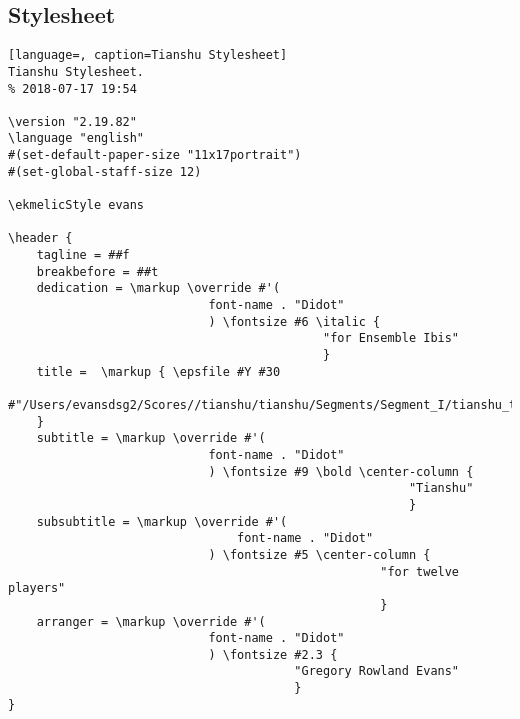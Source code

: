 \subsection{Stylesheet}
\begin{lstlisting}[language=, caption=Tianshu Stylesheet]
Tianshu Stylesheet.
% 2018-07-17 19:54

\version "2.19.82"
\language "english"
#(set-default-paper-size "11x17portrait")
#(set-global-staff-size 12)

\ekmelicStyle evans

\header {
	tagline = ##f
	breakbefore = ##t
	dedication = \markup \override #'(
							font-name . "Didot"
							) \fontsize #6 \italic {
											"for Ensemble Ibis"
											}
	title =  \markup { \epsfile #Y #30
	#"/Users/evansdsg2/Scores//tianshu/tianshu/Segments/Segment_I/tianshu_title.eps" 
	}
	subtitle = \markup \override #'(
							font-name . "Didot"
							) \fontsize #9 \bold \center-column {
														"Tianshu"
														}
	subsubtitle = \markup \override #'(
								font-name . "Didot"
							) \fontsize #5 \center-column {
													"for twelve players"
													}
	arranger = \markup \override #'(
							font-name . "Didot"
							) \fontsize #2.3 {
										"Gregory Rowland Evans"
										}
}


\end{lstlisting}

